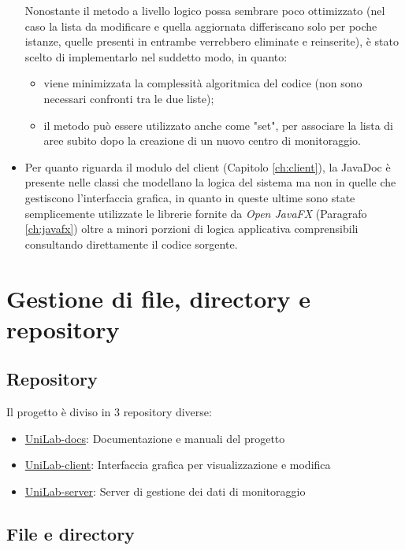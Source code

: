 \begin{itemize}
	Nonostante il metodo a livello logico possa sembrare poco ottimizzato (nel caso la lista da modificare e quella aggiornata differiscano solo per poche istanze, quelle presenti in entrambe verrebbero eliminate e reinserite), è stato scelto di implementarlo nel suddetto modo, in quanto: 
	\begin{itemize}
		\item viene minimizzata la complessità algoritmica del codice (non sono necessari confronti tra le due liste);
		\item il metodo può essere utilizzato anche come "set", per associare la lista di aree subito dopo la creazione di un nuovo centro di monitoraggio.
	\end{itemize}
	\item Per quanto riguarda il modulo del client (Capitolo \ref{ch:client}), la JavaDoc è presente nelle classi che modellano la logica del sistema ma non in quelle che gestiscono l'interfaccia grafica, in quanto in queste ultime sono state semplicemente utilizzate le librerie fornite da \textit{Open JavaFX} (Paragrafo \ref{ch:javafx}) oltre a minori porzioni di logica applicativa comprensibili consultando direttamente il codice sorgente.
\end{itemize}

\chapter{Gestione di file, directory e repository}

\section{Repository}

Il progetto è diviso in 3 repository diverse:

\begin{itemize}
	\item \href{https://github.com/Qu4draetto-A3B/UniLab-docs}{UniLab-docs}: Documentazione e manuali del progetto
	\item \href{https://github.com/Qu4draetto-A3B/UniLab-client}{UniLab-client}: Interfaccia grafica per visualizzazione e modifica
	\item \href{https://github.com/Qu4draetto-A3B/UniLab-server}{UniLab-server}: Server di gestione dei dati di monitoraggio
\end{itemize}

\section{File e directory}

